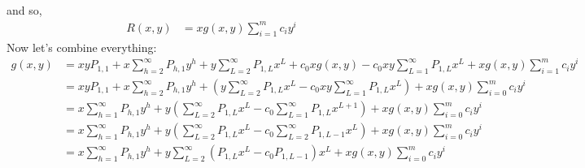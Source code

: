 		and so,
		\begin{align}
			R(x, y) &= x g(x, y)\sum_{i=1}^m c_i y^i
		\end{align}
		Now let's combine everything:
		\begin{align} 
			g(x, y) &= xyP_{1,1} + x\sum_{h=2}^\infty P_{h,1}y^h + y\sum_{L=2}^\infty P_{1, L}x^L + c_0xg(x, y) - c_0xy\sum_{L=1}^\infty P_{1, L}x^L + xg(x, y)\sum_{i=1}^m c_iy^i\\
			&= xyP_{1,1} + x\sum_{h=2}^\infty P_{h,1}y^h + \left(y\sum_{L=2}^\infty P_{1, L}x^L - c_0xy\sum_{L=1}^\infty P_{1, L}x^L\right) + xg(x, y)\sum_{i=0}^m c_iy^i\\
			&= x\sum_{h=1}^\infty P_{h,1}y^h + y\left(\sum_{L=2}^\infty P_{1, L}x^L - c_0\sum_{L=1}^\infty P_{1, L}x^{L+1}\right) + xg(x, y)\sum_{i=0}^m c_iy^i\\
			&= x\sum_{h=1}^\infty P_{h,1}y^h + y\left(\sum_{L=2}^\infty P_{1, L}x^L - c_0\sum_{L=2}^\infty P_{1, L-1}x^L\right) + xg(x, y)\sum_{i=0}^m c_iy^i\\
			&= x\sum_{h=1}^\infty P_{h,1}y^h + y\sum_{L=2}^\infty \left(P_{1, L}x^L - c_0P_{1, L-1}\right)x^L + xg(x, y)\sum_{i=0}^m c_iy^i\
		\end{align}
